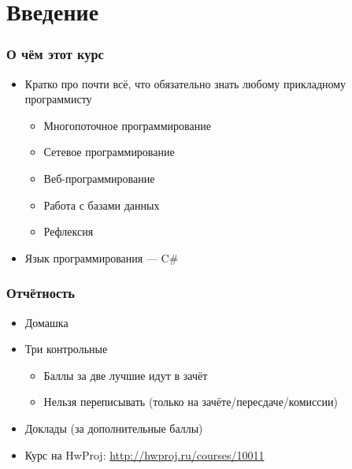 \documentclass{../../slides-style}
\begin{document}
    \begin{frame}[plain]
        \titlepage
    \end{frame}

    \section{Введение}

    \begin{frame}
        \frametitle{О чём этот курс}
        \begin{itemize}
            \item Кратко про почти всё, что обязательно знать любому прикладному программисту
            \begin{itemize}
                \item Многопоточное программирование
                \item Сетевое программирование
                \item Веб-программирование
                \item Работа с базами данных
                \item Рефлексия
            \end{itemize}
            \item Язык программирования --- C\#
        \end{itemize}
    \end{frame}

    \begin{frame}
        \frametitle{Отчётность}
        \begin{itemize}
            \item Домашка
            \item Три контрольные
            \begin{itemize}
                \item Баллы за две лучшие идут в зачёт
                \item Нельзя переписывать (только на зачёте/пересдаче/комиссии)
            \end{itemize}
            \item Доклады (за дополнительные баллы)
            \item Курс на HwProj: \url{http://hwproj.ru/courses/10011}
        \end{itemize}
    \end{frame}
\end{document}
